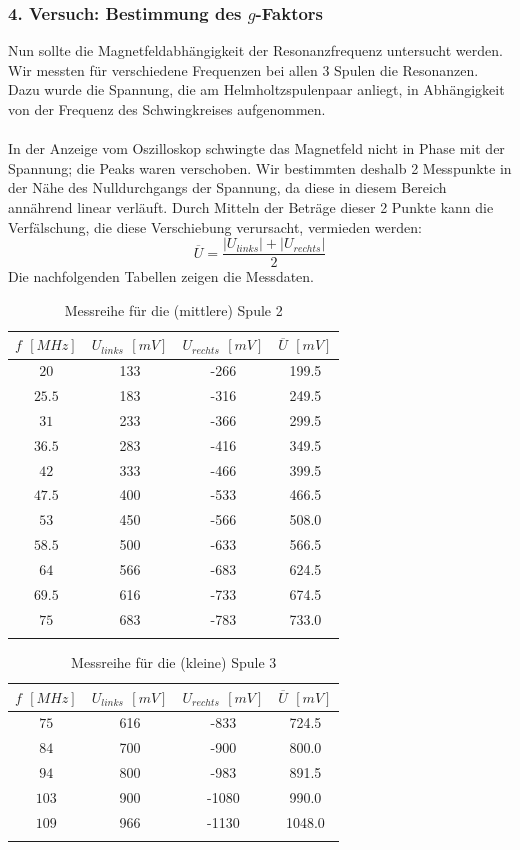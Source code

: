 \documentclass[a4paper,titlepage]{scrartcl}
\numberwithin{equation}{section}
\begin{document}
\subsubsection{4. Versuch: Bestimmung des $g$-Faktors}
Nun sollte die Magnetfeldabhängigkeit der Resonanzfrequenz untersucht werden. Wir messten für verschiedene Frequenzen bei allen 3 Spulen die Resonanzen. Dazu wurde die Spannung, die am Helmholtzspulenpaar anliegt, in Abhängigkeit von der Frequenz des Schwingkreises aufgenommen.\\ \\
In der Anzeige vom Oszilloskop schwingte das Magnetfeld nicht in Phase mit der Spannung; die Peaks waren verschoben. Wir bestimmten deshalb 2 Messpunkte in der Nähe des Nulldurchgangs der Spannung, da diese in diesem Bereich annährend linear verläuft. Durch Mitteln der Beträge dieser 2 Punkte kann die Verfälschung, die diese Verschiebung verursacht, vermieden werden:
\begin{equation*}
\overline{U}=\frac{|U_{links}|+|U_{rechts}|}{2}
\end{equation*}
Die nachfolgenden Tabellen zeigen die Messdaten.
\begin{longtable}[H]{c|c|c|c}
$f$ $[MHz]$ & $U_{links}$ $[mV]$ & $U_{rechts}$ $[mV]$ & $\overline{U}$ $[mV]$ \\
\hline
$20$ & 133 & -266 & 199.5\\
$25.5$ & 183 & -316 & 249.5\\
$31$ & 233 & -366 & 299.5\\
$36.5$ & 283 & -416 & 349.5\\
$42$ & 333 & -466 & 399.5\\
$47.5$ & 400 & -533 & 466.5\\
$53$ & 450 & -566 & 508.0\\
$58.5$ & 500 & -633 & 566.5\\
$64$ & 566 & -683 & 624.5\\
$69.5$ & 616 & -733 & 674.5\\
$75$ & 683 & -783 & 733.0\\
\caption{Messreihe für die (mittlere) Spule 2}
\label{tab:spule2}
\end{longtable}
\begin{longtable}[H]{c|c|c|c}
$f$ $[MHz]$ & $U_{links}$ $[mV]$ & $U_{rechts}$ $[mV]$ & $\overline{U}$ $[mV]$ \\
\hline
$75$ & 616 & -833 & 724.5\\
$84$ & 700 & -900 & 800.0\\
$94$ & 800 & -983 & 891.5\\
$103$ & 900 & -1080 & 990.0\\
$109$ & 966 & -1130 & 1048.0\\
\caption{Messreihe für die (kleine) Spule 3}
\label{tab:spule2}
\end{longtable}
\end{document}
